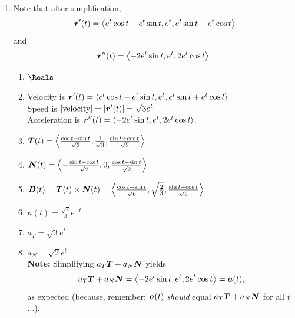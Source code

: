 \documentclass[12pt]{article}
\newcommand{\compslong}[3]{\left\langle #1, #2, #3\right\rangle}
\begin{document}
{\begin{enumerate}
			\newpage
			
			\item Note that after simplification,
			$$\vect{r}'(t)=\compslong{e^t\cos{t}-e^t\sin{t}}{e^t}{e^t\sin{t}+e^t\cos{t}}$$
			and
			$$\vect{r}''(t)=\compslong{-2 e^t \sin{t}}{e^t}{2e^t\cos{t}}.$$
			
			\begin{enumerate}
				\item $\Reals$
				\item Velocity is $\vect{r}'(t)=\compslong{e^t\cos{t}-e^t\sin{t}}{e^t}{e^t\sin{t}+e^t\cos{t}}$\\[3mm]
				Speed is $|\text{velocity}|=|\boldsymbol{r}'(t)|=\sqrt{3}e^t$\\[3mm]
				Acceleration is $\vect{r}''(t)=\compslong{-2 e^t \sin{t}}{e^t}{2e^t\cos{t}}$.
				\item $\vect{T}(t)=\compslong{\frac{\cos{t}-\sin{t}}{\sqrt{3}}}{\frac{1}{\sqrt{3}}}{\frac{\sin{t}+\cos{t}}{\sqrt{3}}}$
				\item $\vect{N}(t)=\compslong{-\frac{\sin{t}+\cos{t}}{\sqrt{2}}}{0}{\frac{\cos{t}-\sin{t}}{\sqrt{2}}}$
				\item $\vect{B}(t)=\vect{T}(t)\times\vect{N}(t)=\compslong{\frac{\cos{t}-\sin{t}}{\sqrt{6}}}{\sqrt{\frac{2}{3}}}{\frac{\sin{t}+\cos{t}}{\sqrt{6}}}$
				\item $\kappa(t)=\frac{\sqrt{2}}{3}e^{-t}$
				\item $a_T=\sqrt{3} e^t$
				\item $a_N=\sqrt{2} e^t$\\
				
				\textbf{Note: }Simplifying $a_T\boldsymbol{T}+a_N\boldsymbol{N}$ yields
				$$a_T\vect{T}+a_N\vect{N}=\compslong{-2 e^t \sin{t}}{e^t}{2e^t\cos{t}}=\vect{a}(t),$$
				as expected (because, remember: $\boldsymbol{a}(t)$ \textit{should} equal $a_T\boldsymbol{T}+a_N\boldsymbol{N}$ for all $t$...).
			\end{enumerate}
		

	\end{enumerate} }
\end{document}
